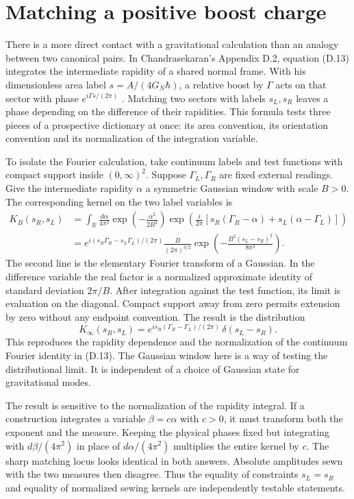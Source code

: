 \documentclass[11pt,letterpaper]{article}
\newcommand{\RR}{\mathbb R}
\begin{document}
\section{Matching a positive boost charge}
\label{sec:boost}
There is a more direct contact with a gravitational calculation than an analogy between two
canonical pairs. In Chandrasekaran's Appendix D.2, equation (D.13) integrates the intermediate
rapidity of a shared normal frame. With his dimensionless area label $s=A/(4G_N\hbar)$, a
relative boost by $\Gamma$ acts on that sector with phase $e^{i\Gamma s/(2\pi)}$ \cite{nc}.
Matching two sectors with labels $s_L,s_R$ leaves a phase depending on the difference of their
rapidities. This formula tests three pieces of a prospective dictionary at once: its area
convention, its orientation convention and its normalization of the integration variable.

To isolate the Fourier calculation, take continuum labels and test functions with compact
support inside $(0,\infty)^2$. Suppose $\Gamma_L,\Gamma_R$ are fixed external readings. Give
the intermediate rapidity $\alpha$ a symmetric Gaussian window with scale $B>0$. The
corresponding kernel on the two label variables is
\begin{align}
 K_B(s_R,s_L)
 &=\int_{\RR}\frac{d\alpha}{4\pi^2}
       \exp\left(-\frac{\alpha^2}{2B^2}\right)
       \exp\left(\frac{i}{2\pi}
       [s_R(\Gamma_R-\alpha)+s_L(\alpha-\Gamma_L)]\right) \nonumber\\
 &=e^{i(s_R\Gamma_R-s_L\Gamma_L)/(2\pi)}
       \frac{B}{(2\pi)^{3/2}}
       \exp\left(-\frac{B^2(s_L-s_R)^2}{8\pi^2}\right).
 \label{eq:reg-match}
\end{align}
The second line is the elementary Fourier transform of a Gaussian. In the difference variable
the real factor is a normalized approximate identity of standard deviation $2\pi/B$. After
integration against the test function, its limit is evaluation on the diagonal. Compact support
away from zero permits extension by zero without any endpoint convention. The result is the
distribution
\[
 K_\infty(s_R,s_L)=
 e^{is_R(\Gamma_R-\Gamma_L)/(2\pi)}\,\delta(s_L-s_R).
\]
This reproduces the rapidity dependence and the normalization of the continuum Fourier identity
in (D.13). The Gaussian window here is a way of testing the distributional limit. It is
independent of a choice of Gaussian state for gravitational modes.

The result is sensitive to the normalization of the rapidity integral. If a construction
integrates a variable $\beta=c\alpha$ with $c>0$, it must transform both the exponent and the
measure. Keeping the physical phases fixed but integrating with $d\beta/(4\pi^2)$ in place of
$d\alpha/(4\pi^2)$ multiplies the entire kernel by $c$. The sharp matching locus looks
identical in both answers. Absolute amplitudes sewn with the two measures then disagree. Thus
the equality of constraints $s_L=s_R$ and equality of normalized sewing kernels are
independently testable statements.
\end{document}
